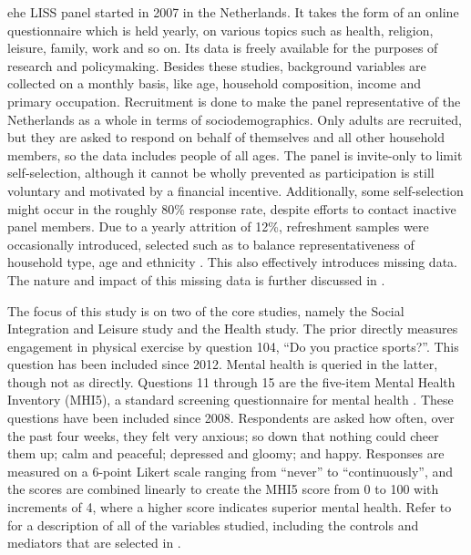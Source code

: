 ehe LISS panel \cite{scherpenzeel2010liss} started in 2007 in the Netherlands. It takes the form of an online questionnaire
which is held yearly, on various topics such as health, religion, leisure, family, work and so on.
Its data is freely available for the purposes of research and policymaking.
Besides these studies, background variables are collected on a monthly basis, like age, household composition,
income and primary occupation.
Recruitment is done to make the panel representative of the Netherlands as a whole in terms of sociodemographics.
Only adults are recruited, but they are asked to respond on behalf of themselves and all other household members,
so the data includes people of all ages.
The panel is invite-only to limit self-selection, although it cannot be wholly prevented as
participation is still voluntary and motivated by a financial incentive. Additionally, some self-selection might occur
in the roughly 80\% response rate, despite efforts to contact inactive panel members. Due to a yearly attrition of 12\%,
refreshment samples were occasionally introduced, selected such as to balance representativeness of household type,
age and ethnicity \cite{lissdata_methodology}. This also effectively introduces missing data.
The nature and impact of this missing data is further discussed in .

The focus of this study is on two of the core studies, namely the Social Integration and Leisure study and the Health study.
The prior directly measures engagement in physical exercise by question 104, ``Do you practice sports?''. This question
has been included since 2012.
Mental health is queried in the latter, though not as directly. Questions 11 through 15 are the five-item Mental Health Inventory
(MHI5), a standard screening questionnaire for mental health \cite{berwick1991performance}. These questions have been included
since 2008.
Respondents are asked how often, over the past four weeks,
they felt very anxious; so down that nothing could cheer them up; calm and peaceful; depressed and gloomy; and happy.
Responses are measured on a 6-point Likert scale ranging from ``never'' to ``continuously'', and the scores are combined
linearly to create the MHI5 score from 0 to 100 with increments of 4, where a higher score indicates superior mental health.
Refer to  for a description of all of the variables studied,
including the controls and mediators that are selected in .

